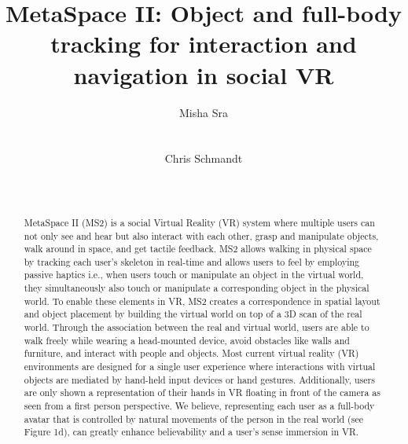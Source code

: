 \documentclass{sigchi}
\begin{document}
\title{MetaSpace II: Object and full-body tracking for interaction and navigation in social VR}

\author{
  \alignauthor Misha Sra\\
    \\
    \\
\alignauthor Chris Schmandt\\
    \\
    \\
}




\maketitle


\begin{abstract}

MetaSpace II (MS2) is a social Virtual Reality (VR) system where multiple users can not only see and hear but also interact with each other, grasp and manipulate objects, walk around in space, and get tactile feedback. MS2 allows walking in physical space by tracking each user's skeleton in real-time and allows users to feel by employing passive haptics i.e., when users touch or manipulate an object in the virtual world, they simultaneously also touch or manipulate a corresponding object in the physical world. To enable these elements in VR, MS2 creates a correspondence in spatial layout and object placement by building the virtual world on top of a 3D scan of the real world. Through the association between the real and virtual world, users are able to walk freely while wearing a head-mounted device, avoid obstacles like walls and furniture, and interact with people and objects. Most current virtual reality (VR) environments are designed for a single user experience where interactions with virtual objects are mediated by hand-held input devices or hand gestures. Additionally, users are only shown a representation of their hands in VR floating in front of the camera as seen from a first person perspective. We believe, representing each user as a full-body avatar that is controlled by natural movements of the person in the real world (see Figure 1d), can greatly enhance believability and a user's sense immersion in VR. 


\end{abstract}
\end{document}
